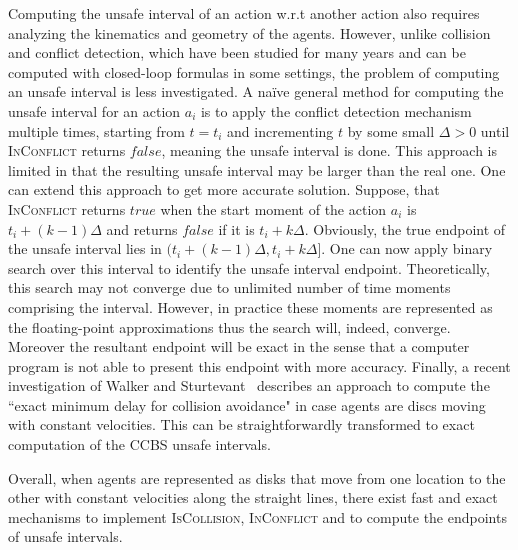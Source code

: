 \documentclass[review]{elsarticle}
\newcommand\konstantin[1]{\nb{\textbf{Konstantin:}}{red}{#1}}
\newcommand\roni[1]{\nb{\textbf{Roni:}}{green}{#1}}
\newcommand{\ccbs}{\ac{CCBS}\xspace}
\newcommand{\iscollision}{\textsc{IsCollision}\xspace}
\newcommand{\inconflict}{\textsc{InConflict}\xspace}
\begin{document}
Computing the unsafe interval of an action w.r.t another action also requires analyzing the kinematics and geometry of the agents. However, unlike collision and conflict detection, which have been studied for many years and can be computed with closed-loop formulas in some settings, the problem of computing an unsafe interval is less investigated.  %
A na\"ive general method for computing the unsafe interval for an action $a_i$ is to apply the conflict detection mechanism multiple times, starting from $t=t_i$ and incrementing $t$ by some small $\Delta>0$ until  \inconflict returns $false$, meaning the unsafe interval is done. This approach is limited in that the resulting unsafe interval may be larger than the real one. One can extend this approach to get more accurate solution. Suppose, that \inconflict returns $true$ when the start moment of the action $a_i$ is $t_i + (k-1)\Delta$ and returns $false$ if it is $t_i + k\Delta$. Obviously, the true endpoint of the unsafe interval lies in $(t_i + (k-1)\Delta, t_i + k\Delta]$. One can now apply binary search over this interval to identify the unsafe interval endpoint. Theoretically, this search may not converge due to unlimited number of time moments comprising the interval. However, in practice these moments are represented as the floating-point approximations thus the search will, indeed, converge. Moreover the resultant endpoint will be exact in the sense that a computer program is not able to present this endpoint with more accuracy. Finally, a recent investigation of Walker and Sturtevant~\cite{walker2019collision} describes an approach to compute the ``exact minimum delay for collision avoidance" in case agents are discs moving with constant velocities. This can be straightforwardly transformed to exact computation of the \ccbs unsafe intervals.

Overall, when agents are represented as disks that move from one location to the other with constant velocities along the straight lines, there exist fast and exact mechanisms to implement \iscollision, \inconflict and to compute the endpoints of unsafe intervals. 


\end{document}
